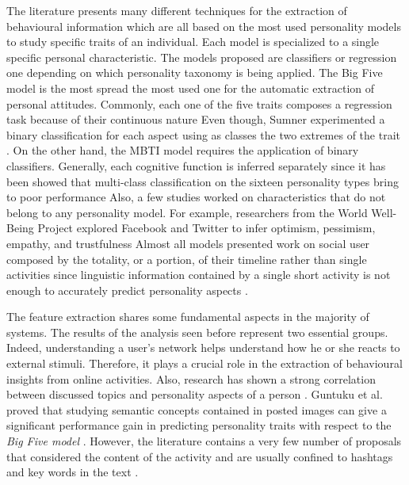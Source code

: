 The literature presents many different techniques for the extraction of behavioural information which are all based on the most used personality models to study specific traits of an individual.
Each model is specialized to a single specific personal characteristic. The models proposed are classifiers or regression one depending on which personality taxonomy is being applied.
The Big Five model is the most spread the most used one for the automatic extraction of personal attitudes. Commonly, each one of the five traits composes a regression task because of their continuous nature \cite{kosinski2013private}
Even though, Sumner experimented a binary classification for each aspect using as classes the two extremes of the trait \cite{sumner2012predicting}.
On the other hand, the MBTI model requires the application of binary classifiers. Generally, each cognitive function is inferred separately since it has been showed that multi-class classification on the sixteen personality types bring to poor performance \cite{lima2019tecla}
Also, a few studies worked on characteristics that do not belong to any personality model. For example, researchers from the World Well-Being Project explored Facebook and Twitter to infer optimism, pessimism, empathy, and trustfulness \cite{ruan2016finding,abdul2017recognizing,zamani2018predicting}
Almost all models presented work on social user composed by the totality, or a portion, of their timeline rather than single activities since linguistic information contained by a single short activity is not enough to accurately predict personality aspects \cite{mairesse2007using}.

The feature extraction shares some fundamental aspects in the majority of systems. The results of the analysis seen before represent two essential groups.
Indeed, understanding a user's network helps understand how he or she reacts to external stimuli. Therefore, it plays a crucial role in the extraction of behavioural insights from online activities.
Also, research has shown a strong correlation between discussed topics and personality aspects of a person \cite{kern2016gaining}.
Guntuku et al. proved that studying semantic concepts contained in posted images can give a significant performance gain in predicting personality traits with respect to the \emph{Big Five model} \cite{guntuku2017studying}.
However, the literature contains a very few number of proposals that considered the content of the activity and are usually confined to hashtags and key words in the text \cite{ruan2016finding}. 

